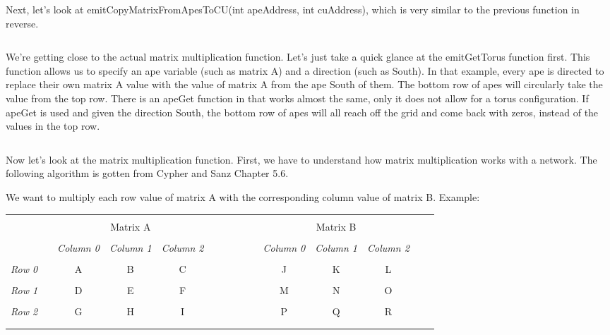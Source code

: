 \documentclass[10pt]{article}
\begin{document}
Next, let’s look at emitCopyMatrixFromApesToCU(int apeAddress, int cuAddress), which is very similar to the previous function in reverse.

\inputminted{c}{mm-emitCopyMatrixFromApesToCU.c}

We’re getting close to the actual matrix multiplication function.  Let’s just take a quick glance at the emitGetTorus function first.  This function allows us to specify an ape variable (such as matrix A) and a direction (such as South).  In that example, every ape is directed to replace their own matrix A value with the value of matrix A from the ape South of them.  The bottom row of apes will circularly take the value from the top row.  There is an apeGet function in that works almost the same, only it does not allow for a torus configuration.  If apeGet is used and given the direction South, the bottom row of apes will all reach off the grid and come back with zeros, instead of the values in the top row.

\inputminted{c}{mm-emitGetTorus.c}

Now let’s look at the matrix multiplication function.  First, we have to understand how matrix multiplication works with a network.  The following algorithm is gotten from Cypher and Sanz Chapter 5.6. \par
We want to multiply each row value of matrix A with the corresponding column value of matrix B.  Example: \par

\begin{tabular}{l*{13}{c}r}
  \\
  \\
  & & & Matrix A & & & & & & & & Matrix B & \\
  \\
  & &
  \textit{Column 0} &
  \textit{Column 1} &
  \textit{Column 2} & & & & & &
  \textit{Column 0} &
  \textit{Column 1} &
  \textit{Column 2}\\
  \\
  \textit{Row 0} & & A & B & C & & & & & & J & K & L \\
  \\
  \textit{Row 1} & & D & E & F & & & & & & M & N & O \\
  \\
  \textit{Row 2} & & G & H & I & & & & & & P & Q & R\\
  \\
  \\
\end{tabular}
\end{document}
